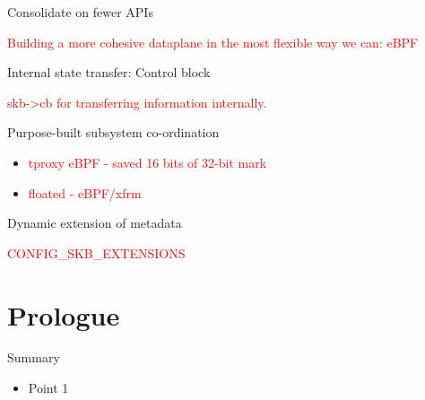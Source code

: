 \documentclass[black,white]{beamer}
\DeclareRobustCommand{\#}{\adjustbox{valign=B,totalheight=.57\baselineskip}{\oldhash}}%
\newcommand\todo[1]{
    \textcolor{red}{#1}
}
\begin{document}
    \begin{frame}{Consolidate on fewer APIs}
        \todo{Building a more cohesive dataplane in the most flexible way we can: eBPF}
    \end{frame}

    \begin{frame}[fragile]{Internal state transfer: Control block}
        \todo{skb->cb for transferring information internally.}
    \end{frame}

    \begin{frame}{Purpose-built subsystem co-ordination}
        \begin{itemize}
            \item \todo{tproxy eBPF - saved 16 bits of 32-bit mark} \bigskip
            \item \todo{floated - eBPF/xfrm} \bigskip
        \end{itemize}
    \end{frame}

    \begin{frame}{Dynamic extension of metadata}
        \todo{CONFIG\_SKB\_EXTENSIONS}
    \end{frame}

    \section*{Prologue}
    \begin{frame}{Summary}
        \begin{itemize}
            \item Point 1
        \end{itemize}
    \end{frame}
\end{document}
